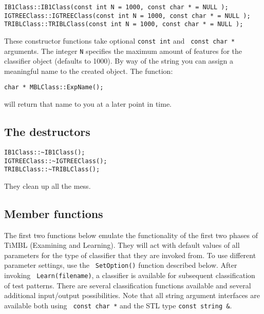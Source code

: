 \documentclass{report}
\begin{document}
\begin{verbatim}
IB1Class::IB1Class(const int N = 1000, const char * = NULL );
IGTREEClass::IGTREEClass(const int N = 1000, const char * = NULL );
TRIBLClass::TRIBLClass(const int N = 1000, const char * = NULL );
\end{verbatim}

These constructor functions take optional {\tt const int} and {\tt
const char *} arguments. The integer {\tt N} specifies the maximum
amount of features for the classifier object (defaults to 1000). By
way of the string you can assign a meaningful name to the created
object. The function:

\begin{verbatim}
char * MBLClass::ExpName();
\end{verbatim}

\noindent
will return that name to you at a later point in time.

\subsection{The destructors}

\begin{verbatim}
IB1Class::~IB1Class();
IGTREEClass::~IGTREEClass();
TRIBLClass::~TRIBLClass();
\end{verbatim}

\noindent
They clean up all the mess.

\subsection{Member functions}

The first two functions below emulate the functionality of the first
two phases of TiMBL (Examining and Learning). They will act with
default values of all parameters for the type of classifier that they
are invoked from. To use different parameter settings, use the {\tt
SetOption()} function described below. After invoking {\tt
Learn(filename)}, a classifier is available for subsequent
classification of test patterns. There are several classification
functions available and several additional input/output possibilities.
Note that all string argument interfaces are available both using {\tt
const char *} and the STL type {\tt const string \&}.
\end{document}
